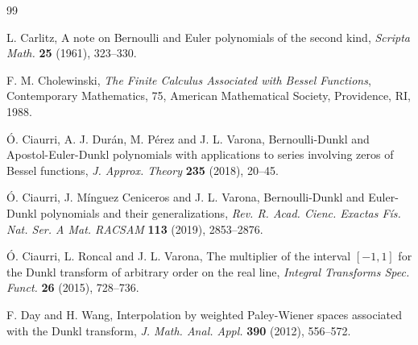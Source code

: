 \documentclass[11pt]{article}
\theoremstyle{plain}
\theoremstyle{remark}
\numberwithin{equation}{section} %
\begin{document}
\begin{thebibliography}{99}

{L. Carlitz},
A note on Bernoulli and Euler polynomials of the second kind,
\textit{Scripta Math.}
\textbf{25} (1961), 323--330.

F. M. Cholewinski, 
\textit{The Finite Calculus Associated with Bessel Functions}, 
Contemporary Mathematics, 75, American Mathematical Society, Providence, RI, 1988.

\'O. Ciaurri, A. J. Dur\'an, M. P\'erez and J. L. Varona,
Bernoulli-Dunkl and Apostol-Euler-Dunkl polynomials with applications to series involving
zeros of Bessel functions,
\textit{J. Approx. Theory}
\textbf{235} (2018), 20--45.

\'O. Ciaurri, J. M\'inguez Ceniceros and J. L. Varona,
{Bernoulli-Dunkl and Euler-Dunkl polynomials and their generalizations},
\textit{Rev. R. Acad. Cienc. Exactas F\'is. Nat. Ser. A Mat. RACSAM} 
\textbf{113} (2019), 2853--2876.



\'O. Ciaurri, L. Roncal and J. L. Varona,
The multiplier of the interval $[-1,1]$ for the Dunkl transform of arbitrary order on the real line, \textit{Integral Transforms Spec. Funct.} 
\textbf{26} (2015), 728--736.

F. Day and H. Wang, 
Interpolation by weighted Paley-Wiener spaces associated with the Dunkl transform, 
\textit{J. Math. Anal. Appl.} \textbf{390} (2012), 556--572. 



\end{thebibliography}
\end{document}
